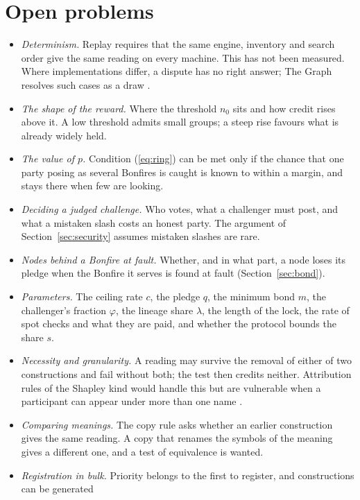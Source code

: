 \section{Open problems}\label{sec:open}

\begin{itemize}
  \item \emph{Determinism.} Replay requires that the same engine, inventory and search order give the same reading
  on every machine. This has not been measured. Where implementations differ, a dispute has no right answer; The
  Graph resolves such cases as a draw \citep{thegraph2026docs}.
  \item \emph{The shape of the reward.} Where the threshold $n_0$ sits and how credit rises above it. A low
  threshold admits small groups; a steep rise favours what is already widely held.
  \item \emph{The value of $p$.} Condition (\ref{eq:ring}) can be met only if the chance that one party posing as
  several Bonfires is caught is known to within a margin, and stays there when few are looking.
  \item \emph{Deciding a judged challenge.} Who votes, what a challenger must post, and what a mistaken slash costs
  an honest party. The argument of Section~\ref{sec:security} assumes mistaken slashes are rare.
  \item \emph{Nodes behind a Bonfire at fault.} Whether, and in what part, a node loses its pledge when the Bonfire
  it serves is found at fault (Section~\ref{sec:bond}).
  \item \emph{Parameters.} The ceiling rate $c$, the pledge $q$, the minimum bond $m$, the challenger's fraction
  $\varphi$, the lineage share $\lambda$, the length of the lock, the rate of spot checks and what they are paid,
  and whether the protocol bounds the share $s$.
  \item \emph{Necessity and granularity.} A reading may survive the removal of either of two constructions and fail
  without both; the test then credits neither. Attribution rules of the Shapley kind would handle this but are
  vulnerable when a participant can appear under more than one name \citep{ohta2008anonymity}.
  \item \emph{Comparing meanings.} The copy rule asks whether an earlier construction gives the same reading. A copy
  that renames the symbols of the meaning gives a different one, and a test of equivalence is wanted.
  \item \emph{Registration in bulk.} Priority belongs to the first to register, and constructions can be generated

\end{itemize}
